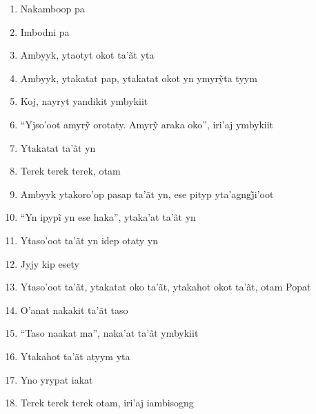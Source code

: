 \begin{enumerate}
 \begin{center}\end{center}

 \item Nakamboop pa

 \item Imbodni pa

 \item Ambyyk, ytaotyt okot ta'ãt yta

 \item Ambyyk, ytakatat pap, ytakatat okot yn ymyrỹta tyym

 \item Koj, nayryt yandikit ymbykiit

 \item ``Yjso’oot amyrỹ orotaty. Amyrỹ araka oko'', iri’aj ymbykiit

 \begin{center}\end{center}

 \item Ytakatat ta'ãt yn

 \item Terek terek terek, otam

 \item Ambyyk ytakoro’op pasap ta’ãt yn, ese pityp yta’agngj̃i’oot

 \item ``Yn ipypĩ yn ese haka'', ytaka’at ta’ãt yn

 \item Ytaso'oot ta'ãt yn idep otaty yn

 \item Jyjy kip esety

 \begin{center}\end{center}

 \item Ytaso'oot ta'ãt, ytakatat oko ta'ãt, ytakahot okot ta'ãt, otam Popat

 \item O'anat nakakit ta'ãt taso

 \item ``Taso naakat ma'', naka'at ta'ãt ymbykiit

 \item Ytakahot ta'ãt atyym yta

 \item Yno yrypat iakat

 \item Terek terek terek otam, iri'aj iambisogng


\end{enumerate}
